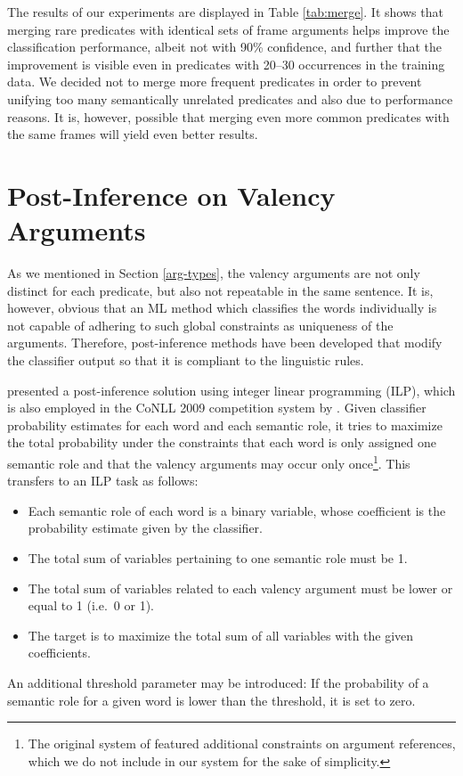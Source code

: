 \documentclass[12pt,notitlepage]{report}
\begin{document}
The results of our experiments are displayed in Table \ref{tab:merge}. It shows that merging rare predicates with identical sets of frame arguments helps improve the classification performance, albeit not with 90\% confidence, and further that the improvement is visible even in predicates with 20--30 occurrences in the training data. We decided not to merge more frequent predicates in order to prevent unifying too many semantically unrelated predicates and also due to performance reasons. It is, however, possible that merging even more common predicates with the same frames will yield even better results.

\section{Post-Inference on Valency Arguments}\label{post-inference}

As we mentioned in Section \ref{arg-types}, the valency arguments are not only distinct for each predicate, but also not repeatable in the same sentence. It is, however, obvious that an ML method which classifies the words individually is not capable of adhering to such global constraints as uniqueness of the arguments. Therefore, post-inference methods have been developed that modify the classifier output so that it is compliant to the linguistic rules. 

\citet{punyakanok04} presented a post-inference solution using integer linear programming (ILP), which is also employed in the CoNLL 2009 competition system by \citet{che09}. Given classifier probability estimates for each word and each semantic role, it tries to maximize the total probability under the constraints that each word is only assigned one semantic role and that the valency arguments may occur only once\footnote{The original system of \citet{punyakanok04} featured additional constraints on argument references, which we do not include in our system for the sake of simplicity.}. This transfers to an ILP task as follows:
\begin{itemize}
    \item Each semantic role of each word is a binary variable, whose coefficient is the probability estimate given by the classifier.
    \item The total sum of variables pertaining to one semantic role must be 1.
    \item The total sum of variables related to each valency argument must be lower or equal to 1 (i.e.\ 0 or 1).
    \item The target is to maximize the total sum of all variables with the given coefficients.
\end{itemize}
An additional threshold parameter may be introduced: If the probability of a semantic role for a given word is lower than the threshold, it is set to zero.
\end{document}
